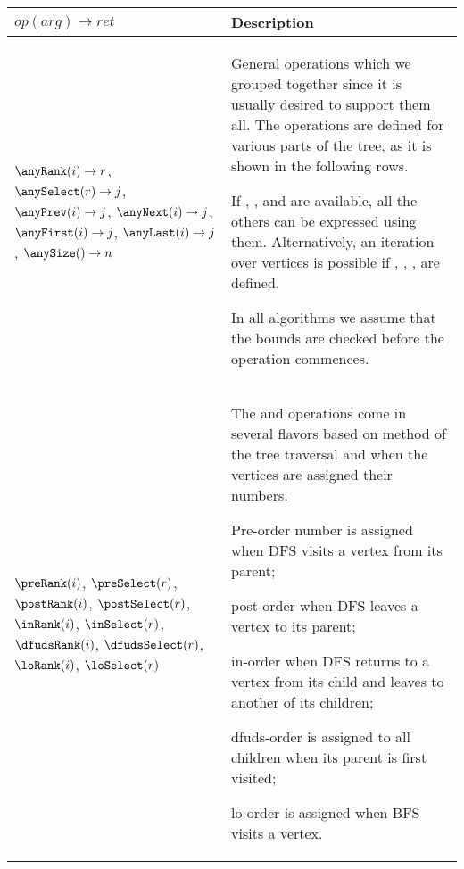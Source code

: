 \begin{sidewaystable}
	\centering
	\begin{tabularx}{\textwidth}{|L{0.5}|J{1.5}|}
		\hline
		$\mathit{op}(\mathit{arg}) \rightarrow \mathit{ret}$
		& Description \\ \hline \hline
		
		$\anyRank(i) \rightarrow r$,
		$\anySelect(r) \rightarrow j$, \newline
		$\anyPrev(i) \rightarrow j$,
		$\anyNext(i) \rightarrow j$, \newline
		$\anyFirst(i) \rightarrow j$,
		$\anyLast(i) \rightarrow j$, \newline
		$\anySize() \rightarrow n$
		& General operations which we grouped together since it is usually desired to support them all.
		The operations are defined for various parts of the tree, as it is shown in the following rows.
		
		If \anyRank{}, \anySelect{}, and \anySize{} are available, all the others can be expressed using them.
		Alternatively, an iteration over vertices is possible if \anyPrev{}, \anyNext{}, \anyFirst{}, \anyLast{} are defined.
		
		In all algorithms we assume that the bounds are checked before the operation commences.\\ \hline \hline
		
		$\preRank(i)$, $\preSelect(r)$, \newline
		$\postRank(i)$, $\postSelect(r)$, \newline
		$\inRank(i)$, $\inSelect(r)$, \newline
		$\dfudsRank(i)$, $\dfudsSelect(r)$, \newline
		$\loRank(i)$, $\loSelect(r)$
		& The \rank{} and \select{} operations come in several flavors based on method of the tree traversal and when the vertices are assigned their numbers.
		\begin{itemize*}
			\item Pre-order number is assigned when DFS visits a vertex from its parent;
			\item post-order when DFS leaves a vertex to its parent;
			\item in-order when DFS returns to a vertex from its child and leaves to another of its children;
			\item dfuds-order is assigned to all children when its parent is first visited;
			\item lo-order is assigned when BFS visits a vertex.
		\end{itemize*}\\ \hline
		

\end{tabularx}
\end{sidewaystable}
